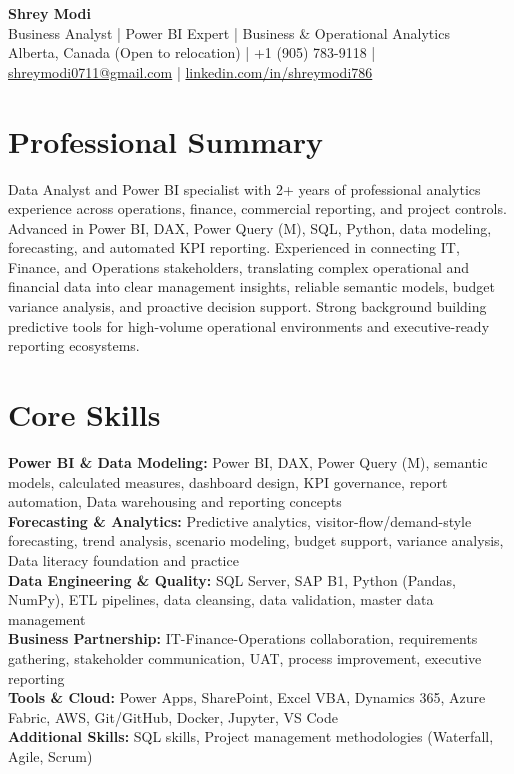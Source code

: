 \documentclass[10.5pt,letterpaper]{article}
\begin{document}
\begin{center}
  {\Huge \bfseries \color{accent} Shrey Modi}\\[0.35em]
  {\normalsize Business Analyst | Power BI Expert | Business \& Operational Analytics}\\[0.25em]
  {\small
    Alberta, Canada (Open to relocation)
 | +1 (905) 783-9118 | \href{mailto:shreymodi0711@gmail.com}{shreymodi0711@gmail.com} | \href{https://linkedin.com/in/shreymodi786}{linkedin.com/in/shreymodi786}  }
\end{center}

\section{Professional Summary}
\noindent Data Analyst and Power BI specialist with 2+ years of professional analytics experience across operations, finance, commercial reporting, and project controls. Advanced in Power BI, DAX, Power Query (M), SQL, Python, data modeling, forecasting, and automated KPI reporting. Experienced in connecting IT, Finance, and Operations stakeholders, translating complex operational and financial data into clear management insights, reliable semantic models, budget variance analysis, and proactive decision support. Strong background building predictive tools for high-volume operational environments and executive-ready reporting ecosystems.


\section{Core Skills}
\noindent
\textbf{Power BI \& Data Modeling:} Power BI, DAX, Power Query (M), semantic models, calculated measures, dashboard design, KPI governance, report automation, Data warehousing and reporting concepts\\
\textbf{Forecasting \& Analytics:} Predictive analytics, visitor-flow/demand-style forecasting, trend analysis, scenario modeling, budget support, variance analysis, Data literacy foundation and practice\\
\textbf{Data Engineering \& Quality:} SQL Server, SAP B1, Python (Pandas, NumPy), ETL pipelines, data cleansing, data validation, master data management\\
\textbf{Business Partnership:} IT-Finance-Operations collaboration, requirements gathering, stakeholder communication, UAT, process improvement, executive reporting\\
\textbf{Tools \& Cloud:} Power Apps, SharePoint, Excel VBA, Dynamics 365, Azure Fabric, AWS, Git/GitHub, Docker, Jupyter, VS Code\\
\textbf{Additional Skills:} SQL skills, Project management methodologies (Waterfall, Agile, Scrum)\\
\end{document}
